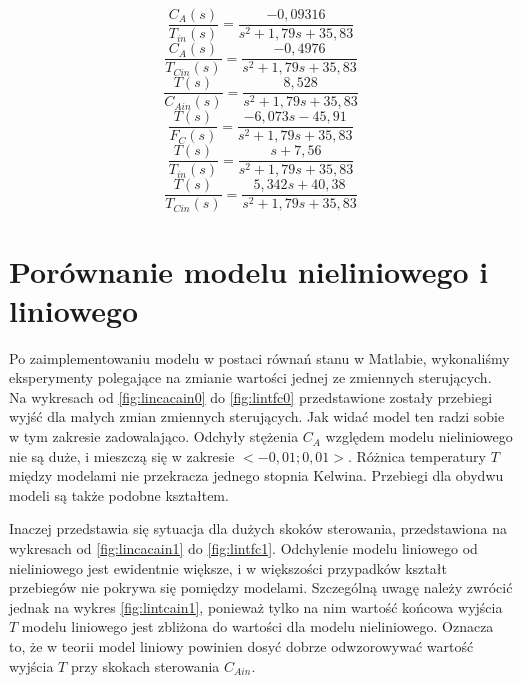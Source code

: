 \begin{equation}
\frac{C_A(s)}{T_{in}(s)} = \frac{-0,09316}{s^2+1,79s+35,83}
\end{equation}
\begin{equation}
\frac{C_A(s)}{T_{Cin}(s)} = \frac{-0,4976}{s^2+1,79s+35,83}
\end{equation}
\begin{equation}
\frac{T(s)}{C_{Ain}(s)} = \frac{8,528}{s^2+1,79s+35,83}
\end{equation}
\begin{equation}
\frac{T(s)}{F_C(s)} = \frac{-6,073s-45,91}{s^2+1,79s+35,83}
\end{equation}
\begin{equation}
\frac{T(s)}{T_{in}(s)} = \frac{s + 7,56}{s^2+1,79s+35,83}
\end{equation}
\begin{equation}
\frac{T(s)}{T_{Cin}(s)} = \frac{5,342 s + 40,38}{s^2+1,79s+35,83}
\end{equation}
\newpage
\section{Porównanie modelu nieliniowego i liniowego}
Po zaimplementowaniu modelu w postaci równań stanu w Matlabie, wykonaliśmy eksperymenty polegające na zmianie wartości jednej ze zmiennych sterujących. Na wykresach od \ref{fig:lincacain0} do \ref{fig:lintfc0} przedstawione zostały przebiegi wyjść dla małych zmian zmiennych sterujących. Jak widać model ten radzi sobie w tym zakresie zadowalająco. Odchyły stężenia $C_A$ względem modelu nieliniowego nie są duże, i mieszczą się w zakresie $<-0,01;0,01>$. Różnica temperatury $T$ między modelami nie przekracza jednego stopnia Kelwina. Przebiegi dla obydwu modeli są także podobne kształtem.

Inaczej przedstawia się sytuacja dla dużych skoków sterowania, przedstawiona na wykresach od \ref{fig:lincacain1} do \ref{fig:lintfc1}. Odchylenie modelu liniowego od nieliniowego jest ewidentnie większe, i w większości przypadków kształt przebiegów nie pokrywa się pomiędzy modelami. Szczególną uwagę należy zwrócić jednak na wykres \ref{fig:lintcain1}, ponieważ tylko na nim wartość końcowa wyjścia $T$ modelu liniowego jest zbliżona do wartości dla modelu nieliniowego. Oznacza to, że w teorii model liniowy powinien dosyć dobrze odwzorowywać wartość wyjścia $T$ przy skokach sterowania $C_{Ain}$.

